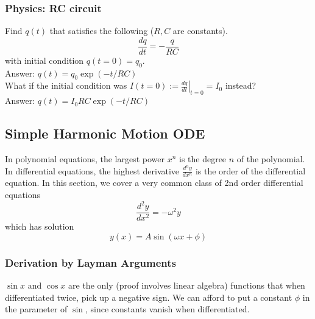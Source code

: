 \documentclass{article}
\begin{document}
\subsubsection{Physics: RC circuit} 
Find $q(t)$ that satisfies the following ($R,C$ are constants).
$$\frac{dq}{dt} = -\frac{q}{RC}$$ with initial condition $q(t=0) = q_0$. \\Answer: $q(t) = q_0 \exp (-t/RC)$ \\[10pt]
What if the initial condition was $I(t=0) := \left. \frac{dq}{dt} \right|_{t=0} = I_0$ instead? \\ Answer: $q(t) = {I_0 RC} \exp (-t/RC)$\\[10pt]

\subsection{Simple Harmonic Motion ODE}
In polynomial equations, the largest power $x^n$ is the degree $n$ of the polynomial. In differential equations, the highest derivative $\frac{d^n y}{dx^n}$ is the order of the differential equation. In this section, we cover a very common class of 2nd order differential equations
$$\frac{d^2 y}{dx^2} = -\omega^2 y$$
which has solution
$$y(x) = A\sin(\omega x + \phi)$$
\subsubsection{Derivation by Layman Arguments}
$\sin x$ and $\cos x$ are the only (proof involves linear algebra) functions that when differentiated twice, pick up a negative sign. We can afford to put a constant $\phi$ in the parameter of $\sin$, since constants vanish when differentiated. 
\end{document}
